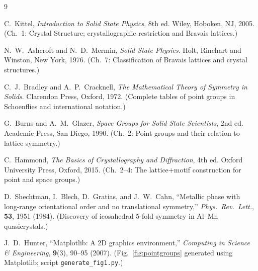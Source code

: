 \documentclass[12pt,a4paper]{article}
\begin{document}
\begin{thebibliography}{9}

C.~Kittel,
\textit{Introduction to Solid State Physics}, 8th ed.
Wiley, Hoboken, NJ, 2005.
(Ch.~1: Crystal Structure; crystallographic restriction and Bravais lattices.)

N.~W.~Ashcroft and N.~D.~Mermin,
\textit{Solid State Physics}.
Holt, Rinehart and Winston, New York, 1976.
(Ch.~7: Classification of Bravais lattices and crystal structures.)

C.~J.~Bradley and A.~P.~Cracknell,
\textit{The Mathematical Theory of Symmetry in Solids}.
Clarendon Press, Oxford, 1972.
(Complete tables of point groups in Schoenflies and international notation.)

G.~Burns and A.~M.~Glazer,
\textit{Space Groups for Solid State Scientists}, 2nd ed.
Academic Press, San Diego, 1990.
(Ch.~2: Point groups and their relation to lattice symmetry.)

C.~Hammond,
\textit{The Basics of Crystallography and Diffraction}, 4th ed.
Oxford University Press, Oxford, 2015.
(Ch.~2--4: The lattice$+$motif construction for point and space groups.)

D.~Shechtman, I.~Blech, D.~Gratias, and J.~W.~Cahn,
``Metallic phase with long-range orientational order and no translational symmetry,''
\textit{Phys.\ Rev.\ Lett.}, \textbf{53}, 1951 (1984).
(Discovery of icosahedral 5-fold symmetry in Al--Mn quasicrystals.)

J.~D.~Hunter,
``Matplotlib: A 2D graphics environment,''
\textit{Computing in Science \& Engineering}, \textbf{9}(3), 90--95 (2007).
(Fig.~\ref{fig:pointgroups} generated using Matplotlib; script \texttt{generate\_fig1.py}.)

\end{thebibliography}
\end{document}

